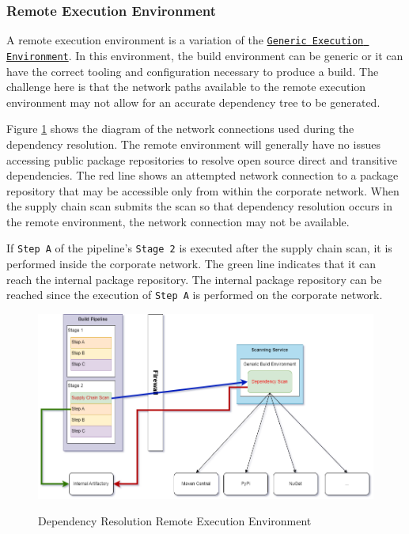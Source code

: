\subsubsection{Remote Execution Environment}

A remote execution environment is a variation of the 
\hyperref[sssec:generic_environment]{\texttt{Generic Execution Environment}}.  In this
environment, the build environment can be generic or it can have the correct tooling
and configuration necessary to produce a build.  The challenge here is that the network
paths available to the remote execution environment may not allow for an accurate
dependency tree to be generated.

Figure \ref{fig:dependency_resolution} shows the diagram of the network connections
used during the dependency resolution.  The remote environment will generally have
no issues accessing public package repositories to resolve open source direct and transitive
dependencies.  The red line shows an attempted network connection to a package
repository that may be accessible only from within the corporate network.  When the
supply chain scan submits the scan so that dependency resolution occurs in the
remote environment, the network connection may not be available.  

If \texttt{Step A} of the pipeline's \texttt{Stage 2} is executed after the supply chain
scan, it is performed inside the corporate network.  The green line indicates that it can 
reach the internal package repository.  The internal package repository can be reached
since the execution of \texttt{Step A} is performed on the corporate network.

\begin{figure}[h]
    \caption{Dependency Resolution Remote Execution Environment}
    \includegraphics[width=\textwidth]{graphics/dependency_resolution.png}
    \label{fig:dependency_resolution}
\end{figure}

